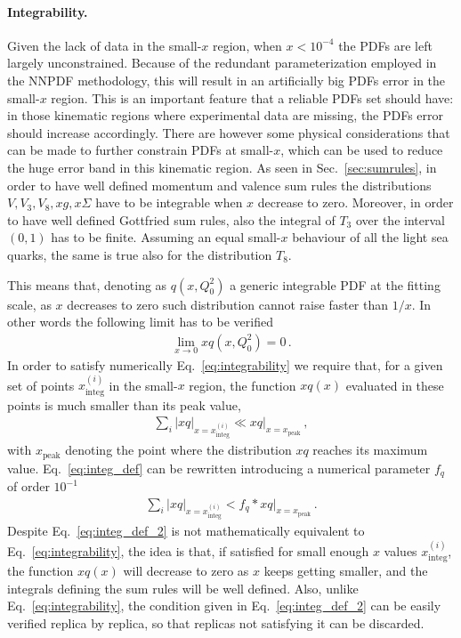 \paragraph{Integrability.}
Given the lack of data in the small-$x$ region, when $x<10^{-4}$ the PDFs are left largely unconstrained. 
Because of the redundant parameterization employed in the NNPDF methodology, this will result in 
an artificially big PDFs error in the small-$x$ region.
This is an important feature that a reliable PDFs set should have: in those kinematic regions where experimental data
are missing, the PDFs error should increase accordingly.
There are however some physical considerations that can be made to further constrain PDFs at small-$x$, 
which can be used to reduce the huge error band in this kinematic region. 
As seen in Sec.~\ref{sec:sumrules}, in order to have well defined momentum and valence sum rules
the distributions $V, V_3, V_8, xg, x\Sigma$ have to be integrable when $x$ decrease to zero.
Moreover, in order to have well defined Gottfried sum rules, also the integral of $T_3$ over the interval
$\left(0,1\right)$ has to be finite. 
Assuming an equal small-$x$ behaviour of all the light sea quarks, the same is true also for the distribution $T_8$.

This means that, denoting as $q\left(x,Q_0^2\right)$ a generic integrable PDF at the fitting scale, as $x$ decreases to zero
such distribution cannot raise faster than $1/x$. In other words the following limit has to be verified
\begin{align}
    \label{eq:integrability}
    \lim_{x\rightarrow 0} xq\left(x,Q_0^2\right) = 0\,.
\end{align}
%
In order to satisfy numerically Eq.~\eqref{eq:integrability}
we require that, for a given set of points $x^{(i)}_{\text{integ}}$ in the small-$x$ region,
the function $xq\left(x\right)$ evaluated in these points is much smaller than its peak value,
\begin{align}
    \label{eq:integ_def}
    \sum_i|xq|_{x=x^{(i)}_{\text{integ}}} \ll xq|_{x=x_{\text{peak}}}\,,
\end{align}
with $x_{\text{peak}}$ denoting the point where the distribution $xq$ reaches its maximum value.
Eq.~\eqref{eq:integ_def} can be rewritten introducing a numerical parameter $f_q$ of order $10^{-1}$
\begin{align}
    \label{eq:integ_def_2}
    \sum_i|xq|_{x=x^{(i)}_{\text{integ}}} < f_q*xq|_{x=x_{\text{peak}}}\,.
\end{align}
Despite Eq.~\eqref{eq:integ_def_2} is not mathematically equivalent to Eq.~\eqref{eq:integrability},
 the idea is that,
if satisfied for small enough $x$ values $x^{(i)}_{\text{integ}}$, the function $xq\left(x\right)$ will 
decrease to zero as $x$ keeps getting smaller, and the integrals defining the sum rules will be 
well defined. Also, unlike Eq.~\eqref{eq:integrability}, the condition given
in Eq.~\eqref{eq:integ_def_2} can be easily verified replica by replica, so that replicas not satisfying it
can be discarded.

